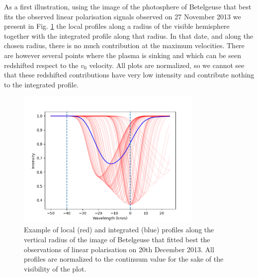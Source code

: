 \documentclass{/Users/art2/TeX/aanda/aa}
\def\kms {km\,s$^{-1}$}
\begin{document}
As a first illustration, using the image of the photosphere of Betelgeuse that best fits the observed linear polarisation signals observed on 
27 November 2013 \citep{auriere_discovery_2016} we present in Fig. \ref{figequateur} the local profiles along a radius of the visible hemisphere 
together with the integrated profile along that radius. In that date, and along the chosen radius, there is no much contribution at the maximum 
velocities. There are however several points where the plasma is sinking and which can be seen redshifted respect to the $v_0$ velocity. All plots 
are normalized, so we cannot see that these redshifted contributions have very low intensity and contribute nothing to the integrated profile. 
\begin{figure}
   \includegraphics[width=0.8\textwidth]{Fig4.png} %
   \caption{ Example of local (red) and integrated (blue) profiles along the vertical radius of the image of Betelgeuse that fitted best 
   the observations of linear polarisation on 20th December 2013. All profiles are normalized to the continuum value for the sake of the visibility of the plot.}
   \label{figequateur}
   \end{figure}
\end{document}
